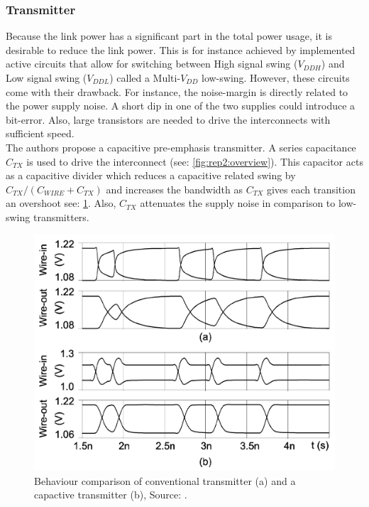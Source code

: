 \subsubsection{Transmitter}
Because the link power has a significant part in the total power usage, it is desirable to reduce the link power. 
This is for instance achieved by implemented active circuits that allow for switching between High signal swing ($V_{DDH}$) and Low signal swing ($V_{DDL}$) called a Multi-$V_{DD}$ low-swing. 
However, these circuits come with their drawback. 
For instance, the noise-margin is directly related to the power supply noise. 
A short dip in one of the two supplies could introduce a bit-error.
Also, large transistors are needed to drive the interconnects with sufficient speed.
\\
The authors propose a capacitive pre-emphasis transmitter. 
A series capacitance $C_{TX}$ is used to drive the interconnect (see: \cref{fig:rep2:overview}). 
This capacitor acts as a capacitive divider which reduces a capacitive related swing by $C_{TX} / ( C_{WIRE} + C_{TX})$ and increases the bandwidth as $C_{TX}$ gives each transition an overshoot see: \cref{fig:rep2:capovershoot}.
Also, $C_{TX}$ attenuates the supply noise in comparison to low-swing transmitters.

\begin{figure}	\centering
	
	\includegraphics[width=0.8\linewidth]{Figures/Rep2TransmitterCap.png}
	\caption{Behaviour comparison of conventional transmitter (a) and a capactive transmitter (b), Source: \cite{schinkel2009low}.} 
    \label{fig:rep2:capovershoot}
\end{figure}

